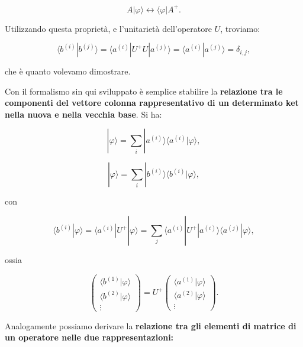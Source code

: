 \documentclass[a4paper,12pt,oneside]{book}
\begin{document}
\begin{equation}
A | \varphi \rangle  \leftrightarrow   \langle \varphi  | A^+ .
\end{equation}

Utilizzando questa proprietà, e l'unitarietà dell'operatore $U$, troviamo:

\begin{equation}
\langle b^{(i)} | b^{(j)} \rangle = \langle a^{(i)} | U^{+}U | a^{(j)} \rangle = \langle a^{(i)} |  a^{(j)} \rangle = \delta_{i,j} ,
\end{equation}

che è quanto volevamo dimostrare.

Con il formalismo sin qui sviluppato è semplice stabilire la \textbf{relazione tra le componenti del vettore colonna rappresentativo di un determinato ket nella nuova e nella vecchia base}. Si ha:

\begin{equation}
| \varphi \rangle = \sum \limits_{i}  | a^{(i)} \rangle \langle a^{(i)} | \varphi  \rangle ,
\end{equation}

\begin{equation}
| \varphi \rangle = \sum \limits_{i}  | b^{(i)} \rangle \langle b^{(i)} | \varphi \rangle ,
\end{equation}

con

\begin{equation}
\langle b^{(i)} | \varphi \rangle = \langle a^{(i)} |  U^+ | \varphi \rangle = \sum \limits_{j} \langle a^{(i)} | U^+ | a^{(i)}\rangle \langle a^{(j)} | \varphi \rangle ,
\end{equation}

ossia

\begin{equation}
\begin{pmatrix}
\langle b^{(1)} | \varphi \rangle \\
\langle b^{(2)} | \varphi \rangle \\
\vdots 
\end{pmatrix} = U^+
\begin{pmatrix}
\langle a^{(1)} | \varphi \rangle \\
\langle a^{(2)} | \varphi \rangle \\
\vdots 
\end{pmatrix} .
\end{equation}

Analogamente possiamo derivare  la \textbf{relazione tra gli elementi di matrice di un operatore nelle due rappresentazioni:}
\end{document}

